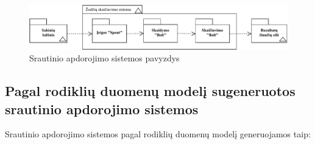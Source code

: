 \documentclass{VUMIFPSbakalaurinis}
\begin{document}
\begin{figure}[H]
    \centering
    \includegraphics[width=1\textwidth]{img/pavyzdine_sistema.pdf}
    \caption{Srautinio apdorojimo sistemos pavyzdys}
    \label{img:example}
\end{figure}

\subsection{Pagal rodiklių duomenų modelį sugeneruotos srautinio apdorojimo sistemos}
Srautinio apdorojimo sistemos pagal rodiklių duomenų modelį generuojamos taip:
\end{document}
